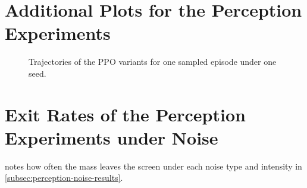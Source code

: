 

\section{Additional Plots for the Perception Experiments}
\label{sec:app-perc-plots}

\begin{figure}[htbp]
  \centering
  \caption[Example trajectories of the PPO variants.]{Trajectories of the PPO variants for one sampled episode under one seed.}
  \label{fig:app-perc-trajectories}
\end{figure}


\section{Exit Rates of the Perception Experiments under Noise}
\label{sec:app-perc-noise-terminated}

 notes how often the mass leaves the screen under each noise type and
intensity in \cref{subsec:perception-noise-results}.


